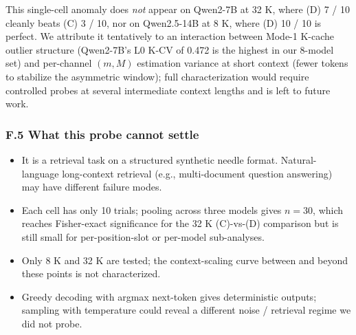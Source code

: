 \documentclass[
]{article}
\providecommand{\tightlist}{%
  \setlength{\itemsep}{0pt}\setlength{\parskip}{0pt}}
\begin{document}
This single-cell anomaly does \emph{not} appear on Qwen2-7B at 32 K,
where (D) 7 / 10 cleanly beats (C) 3 / 10, nor on Qwen2.5-14B at 8 K,
where (D) 10 / 10 is perfect. We attribute it tentatively to an
interaction between Mode-1 K-cache outlier structure (Qwen2-7B's L0 K-CV
of 0.472 is the highest in our 8-model set) and per-channel \((m, M)\)
estimation variance at short context (fewer tokens to stabilize the
asymmetric window); full characterization would require controlled
probes at several intermediate context lengths and is left to future
work.

\subsubsection{F.5 What this probe cannot
settle}\label{f.5-what-this-probe-cannot-settle}

\begin{itemize}
\tightlist
\item
  It is a retrieval task on a structured synthetic needle format.
  Natural-language long-context retrieval (e.g., multi-document question
  answering) may have different failure modes.
\item
  Each cell has only 10 trials; pooling across three models gives
  \(n = 30\), which reaches Fisher-exact significance for the 32 K
  (C)-vs-(D) comparison but is still small for per-position-slot or
  per-model sub-analyses.
\item
  Only 8 K and 32 K are tested; the context-scaling curve between and
  beyond these points is not characterized.
\item
  Greedy decoding with argmax next-token gives deterministic outputs;
  sampling with temperature could reveal a different noise / retrieval
  regime we did not probe.
\end{itemize}
\end{document}

